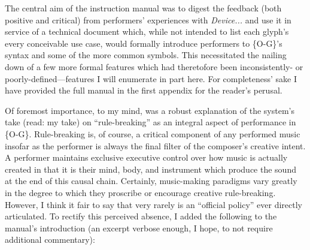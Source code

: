 
    The central aim of the instruction manual was to digest the feedback (both positive and critical) from performers' experiences with \textit{Device...} and use it in service of a technical document which, while not intended to list each glyph's every conceivable use case, would formally introduce performers to \{O-G\}'s syntax and some of the more common symbols. This necessitated the nailing down of a few more formal features which had theretofore been inconsistently- or poorly-defined---features I will enumerate in part here. For completeness' sake I have provided the full manual in the first appendix for the reader's perusal. 

    Of foremost importance, to my mind, was a robust explanation of the system's take (read: my take) on ``rule-breaking'' as an integral aspect of performance in \{O-G\}. Rule-breaking is, of course, a critical component of any performed music insofar as the performer is always the final filter of the composer's creative intent. A performer maintains exclusive executive control over how music is actually created in that it is their mind, body, and instrument which produce the sound at the end of this causal chain. Certainly, music-making paradigms vary greatly in the degree to which they proscribe or encourage creative rule-breaking. However, I think it fair to say that very rarely is an ``official policy'' ever directly articulated. To rectify this perceived absence, I added the following to the manual's introduction (an excerpt verbose enough, I hope, to not require additional commentary):

